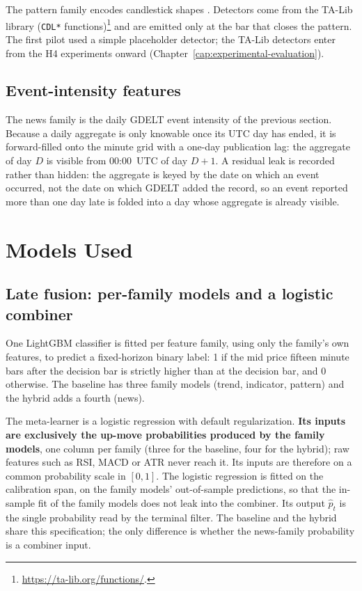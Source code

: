 The pattern family encodes candlestick shapes \cite{nison1991candlestick}. Detectors come from the TA-Lib library (\texttt{CDL*} functions)\footnote{\url{https://ta-lib.org/functions/}.} and are emitted only at the bar that closes the pattern. The first pilot used a simple placeholder detector; the TA-Lib detectors enter from the H4 experiments onward (Chapter~\ref{cap:experimental-evaluation}).

\subsection{Event-intensity features} \label{subsec:sentiment-features} \label{subsec:event-features}

The news family is the daily GDELT event intensity of the previous section. Because a daily aggregate is only knowable once its UTC day has ended, it is forward-filled onto the minute grid with a one-day publication lag: the aggregate of day $D$ is visible from 00:00~UTC of day $D+1$. A residual leak is recorded rather than hidden: the aggregate is keyed by the date on which an event occurred, not the date on which GDELT added the record, so an event reported more than one day late is folded into a day whose aggregate is already visible.

\section{Models Used} \label{sec:fusion}

\subsection{Late fusion: per-family models and a logistic combiner} \label{subsec:late-fusion}

One LightGBM classifier is fitted per feature family, using only the family's own features, to predict a fixed-horizon binary label: 1 if the mid price fifteen minute bars after the decision bar is strictly higher than at the decision bar, and 0 otherwise. The baseline has three family models (trend, indicator, pattern) and the hybrid adds a fourth (news).

The meta-learner is a logistic regression with default regularization. \textbf{Its inputs are exclusively the up-move probabilities produced by the family models}, one column per family (three for the baseline, four for the hybrid); raw features such as RSI, MACD or ATR never reach it. Its inputs are therefore on a common probability scale in $[0,1]$. The logistic regression is fitted on the calibration span, on the family models' out-of-sample predictions, so that the in-sample fit of the family models does not leak into the combiner. Its output $\hat{p}_t$ is the single probability read by the terminal filter. The baseline and the hybrid share this specification; the only difference is whether the news-family probability is a combiner input.

